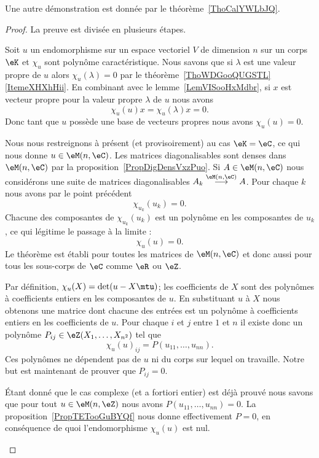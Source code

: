Une autre démonstration est donnée par le théorème~\ref{ThoCalYWLbJQ}.
\begin{proof}
	La preuve est divisée en plusieurs étapes.
	\begin{subproof}
		Soit \( u\) un endomorphisme sur un espace vectoriel \( V\) de dimension \( n\) sur un corps \( \eK\) et \( \chi_u\) sont polynôme caractéristique. Nous savons que si \( \lambda\) est une valeur propre de \( u\) alors \( \chi_u(\lambda)=0\) par le théorème~\ref{ThoWDGooQUGSTL}\ref{ItemeXHXhHii}. En combinant avec le lemme~\ref{LemVISooHxMdbr}, si \( x\) est vecteur propre pour la valeur propre \( \lambda\) de \( u\) nous avons
		\begin{equation}
			\chi_u(u)x=\chi_u(\lambda)x=0.
		\end{equation}
		Donc tant que \( u\) possède une base de vecteurs propres nous avons \( \chi_u(u)=0\).


		Nous nous restreignons à présent (et provisoirement) au cas \( \eK=\eC\), ce qui nous donne \( u\in \eM(n,\eC)\). Les matrices diagonalisables sont denses dans \( \eM(n,\eC)\) par la proposition~\ref{PropDigDensVxzPuo}. Si \( A\in \eM(n,\eC)\) nous considérons une suite de matrices diagonalisables \( A_k\stackrel{\eM(n,\eC)}{\longrightarrow}A\). Pour chaque \( k\) nous avons par le point précédent
		\begin{equation}
			\chi_{u_k}(u_k)=0.
		\end{equation}
		Chacune des composantes de \( \chi_{u_k}(u_k)\) est un polynôme en les composantes de \( u_k\), ce qui légitime le passage à la limite :
		\begin{equation}
			\chi_u(u)=0.
		\end{equation}
		Le théorème est établi pour toutes les matrices de \( \eM(n,\eC)\) et donc aussi pour tous les sous-corps de \( \eC\) comme \( \eR\) ou \( \eZ\).


		Par définition, \( \chi_u(X)=\det(u-X\mtu)\); les coefficients de \( X\) sont des polynômes à coefficients entiers en les composantes de \( u\). En substituant \( u\) à \( X\) nous obtenons une matrice dont chacune des entrées est un polynôme à coefficients entiers en les coefficients de \( u\). Pour chaque \( i\) et \( j\) entre \( 1\) et \( n\) il existe donc un polynôme \( P_{ij}\in \eZ(X_1,\ldots, X_{n^2})\) tel que
		\begin{equation}
			\chi_u(u)_{ij}=P(u_{11},\ldots, u_{nn}).
		\end{equation}
		Ces polynômes ne dépendent pas de \( u\) ni du corps sur lequel on travaille. Notre but est maintenant de prouver que \( P_{ij}=0\).

		Étant donné que le cas complexe (et a fortiori entier) est déjà prouvé nous savons que pour tout \( u\in \eM(n,\eZ)\) nous avons \( P(u_{11},\ldots, u_{nn})=0\). La proposition~\ref{PropTETooGuBYQf} nous donne effectivement \( P=0\), en conséquence de quoi l'endomorphisme \( \chi_u(u)\) est nul.

	\end{subproof}
\end{proof}

